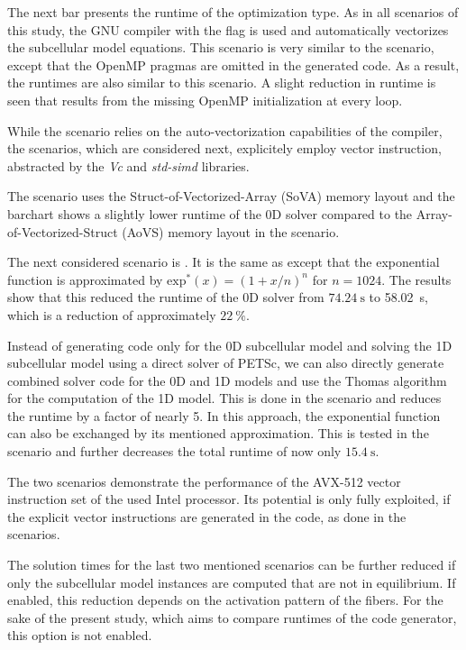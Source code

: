 The next bar presents the runtime of the  optimization type. As in all scenarios of this study, the GNU compiler with the  flag is used and automatically vectorizes the subcellular model equations. This scenario is very similar to the  scenario, except that the OpenMP pragmas are omitted in the generated code. As a result, the runtimes are also similar to this scenario. A slight reduction in runtime is seen that results from the missing OpenMP initialization at every loop.

While the  scenario relies on the auto-vectorization capabilities of the compiler, the  scenarios, which are considered next, explicitely employ vector instruction, abstracted by the \emph{Vc} and \emph{std-simd} libraries. 

The  scenario uses the Struct-of-Vectorized-Array (SoVA) memory layout and the barchart shows a slightly lower runtime of the 0D solver compared to the Array-of-Vectorized-Struct (AoVS) memory layout in the  scenario.

The next considered scenario is . It is the same as  except that the exponential function is approximated by $\textrm{exp}^\ast(x)=(1+x/n)^n$ for $n=1024$. The results show that this reduced the runtime of the 0D solver from $\SI{74.24}{\s}$ to \SI{58.02}{\s}, which is a reduction of approximately $\SI{22}{\percent}$.

Instead of generating code only for the 0D subcellular model and solving the 1D subcellular model using a direct solver of PETSc, we can also directly generate combined solver code for the 0D and 1D models and use the Thomas algorithm for the computation of the 1D model. This is done in the  scenario and reduces the runtime by a factor of nearly 5. In this approach, the exponential function can also be exchanged by its mentioned approximation. This is tested in the  scenario and further decreases the total runtime of now only $\SI{15.4}{\s}$.

The two  scenarios demonstrate the performance of the AVX-512 vector instruction set of the used Intel processor. Its potential is only fully exploited, if the explicit vector instructions are generated in the code, as done in the  scenarios.

The solution times for the last two mentioned scenarios can be further reduced if only the subcellular model instances are computed that are not in equilibrium. If enabled, this reduction depends on the activation pattern of the fibers. For the sake of the present study, which aims to compare runtimes of the code generator, this option is not enabled.

